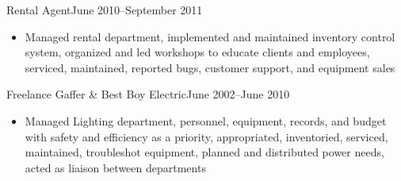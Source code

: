\documentclass[letterpaper]{article}        %
\begin{document}
            {Rental Agent}{June 2010--September 2011}
    \begin{itemize}
      \item Managed rental department, implemented and maintained inventory %
            control system, organized and led workshops to educate clients %
            and employees, serviced, maintained, reported bugs, customer %
            support, and equipment sales
    \end{itemize}

            {Freelance Gaffer \& Best Boy Electric}{June 2002--June 2010}
    \begin{itemize}
      \item Managed Lighting department, personnel, equipment, records, and %
            budget with safety and efficiency as a priority, appropriated, %
            inventoried, serviced, maintained, troubleshot equipment, planned %
            and distributed power needs, acted as liaison between departments
    \end{itemize}
\end{document}
